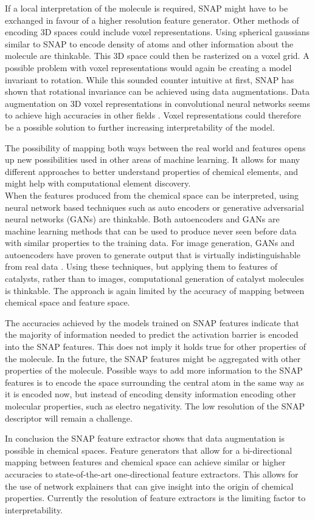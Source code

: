 If a local interpretation of the molecule is required, SNAP might have to be exchanged in favour of a higher resolution 
feature generator.
Other methods of encoding 3D spaces could include voxel representations.
Using spherical gaussians similar to SNAP to encode density of atoms and other information about the molecule are thinkable.
This 3D space could then be rasterized on a voxel grid.
A possible problem with voxel representations would again be creating a model invariant to rotation.
While this sounded counter intuitive at first, SNAP has shown that rotational invariance can be achieved using data augmentations.
Data augmentation on 3D voxel representations in convolutional neural networks seems to achieve high accuracies in 
other fields \cite{7353481}.
Voxel representations could therefore be a possible solution to further increasing interpretability of the model.

The possibility of mapping both ways between the real world and features opens up new possibilities 
used in other areas of machine learning.
It allows for many different approaches to better understand properties of chemical elements, 
and might help with computational element discovery.
\\
When the features produced from the chemical space can be interpreted,
using neural network based techniques such as auto encoders or generative adversarial neural networks (GANs) are thinkable.
Both autoencoders and GANs are machine learning methods that can be used to produce never seen before data with similar properties
to the training data.
For image generation, GANs and autoencoders have proven to generate output that is virtually indistinguishable from real data \cite{karras2019stylebased} .
Using these techniques, but applying them to features of catalysts, rather than to images, computational generation of catalyst molecules is thinkable.
The approach is again limited by the accuracy of mapping between chemical space and feature space.

The accuracies achieved by the models trained on SNAP features indicate that 
the majority of information needed to predict the activation barrier is encoded into the SNAP features.
This does not imply it holds true for other properties of the molecule.
In the future, the SNAP features might be aggregated with other properties of the molecule.
Possible ways to add more information to the SNAP features is to encode the space surrounding the 
central atom in the same way as it is encoded now, but instead of encoding density information encoding 
other molecular properties, such as electro negativity.
The low resolution of the SNAP descriptor will remain a challenge.

In conclusion the SNAP feature extractor shows that data augmentation is possible in chemical spaces.
Feature generators that allow for a bi-directional mapping between features and chemical space can achieve similar or higher
accuracies to state-of-the-art one-directional feature extractors.
This allows for the use of network explainers that can give insight into the origin of chemical properties.
Currently the resolution of feature extractors is the limiting factor to interpretability.
